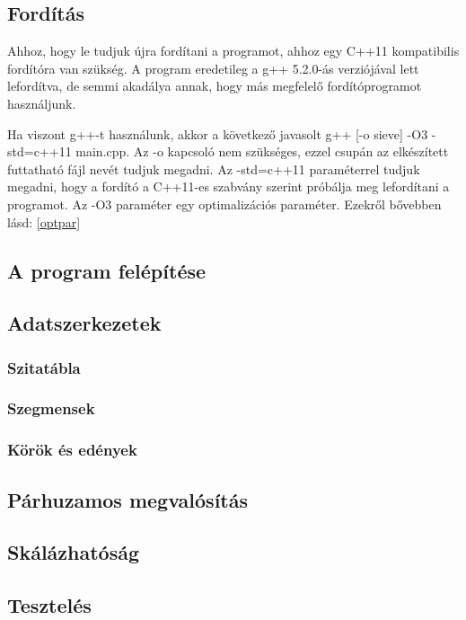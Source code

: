 \documentclass[twoside, a4paper, 12pt]{article}
\begin{document}
\subsection{Fordítás} \label{build}

Ahhoz, hogy le tudjuk újra fordítani a programot, ahhoz egy C++11 kompatibilis fordítóra van szükség. A program eredetileg a g++ 5.2.0-ás verziójával lett lefordítva, de semmi akadálya annak, hogy más megfelelő fordítóprogramot használjunk. \par
Ha viszont g++-t használunk, akkor a következő javasolt g++ [-o sieve] -O3 -std=c++11 main.cpp. Az -o kapcsoló nem szükséges, ezzel csupán az elkészített futtatható fájl nevét tudjuk megadni. Az -std=c++11 paraméterrel tudjuk megadni, hogy a fordító a C++11-es szabvány szerint próbálja meg lefordítani a programot. Az -O3 paraméter egy optimalizációs paraméter. Ezekről bővebben lásd: \ref{optpar}

\subsection{A program felépítése}

\subsection{Adatszerkezetek}

\subsubsection{Szitatábla}
\subsubsection{Szegmensek}
\subsubsection{Körök és edények}

\subsection{Párhuzamos megvalósítás}

\subsection{Skálázhatóság} \label{scale}

\subsection{Tesztelés} \label{test}
\end{document}
